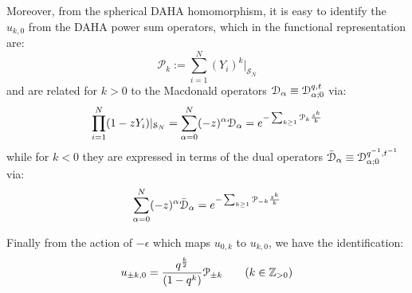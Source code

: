 Moreover, from the spherical DAHA homomorphism, it is easy to identify the $u_{k,0}$ from
the DAHA power sum operators, which in the functional representation are:
$${\mathcal P}_k := \sum_{i=1}^N (Y_i)^k \vert_{{\mathcal S}_N} $$
and are related for $k>0$ to the Macdonald operators ${\mathcal D}_{\alpha}\equiv {\mathcal D}_{{\alpha};0}^{q,t}$ via:
\begin{equation}\label{posiP}\prod_{i=1}^N(1-z Y_i)\vert_{{\mathcal S}_N}=\sum_{{\alpha}=0}^N (-z)^{\alpha} {\mathcal D}_{\alpha} =
e^{-\sum_{k\geq 1} {\mathcal P}_k \frac{z^k}{k}} 
\end{equation}
while for $k<0$ they are expressed in terms of the dual operators 
$\bar{\mathcal D}_{\alpha}\equiv {\mathcal D}_{{\alpha};0}^{q^{-1},t^{-1}}$ via:
\begin{equation}\label{negaP}\sum_{{\alpha}=0}^N (-z)^{\alpha} \bar{\mathcal D}_{\alpha} =
e^{-\sum_{k\geq 1} {\mathcal P}_{-k} \frac{z^k}{k}} 
\end{equation}

Finally from the action of $-\epsilon$ which maps $u_{0,k}$ to $u_{k,0}$, we have the identification:
\begin{equation} u_{\pm k,0}= \frac{q^{\frac{k}{2}}}{(1-q^k)} {\mathcal P}_{\pm k}\qquad (k\in {\mathbb Z}_{>0})
\end{equation}

